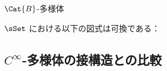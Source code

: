 \documentclass[TQFT_main]{subfiles}
\begin{document}
\begin{mydef}[label=def:B-mfld,breakable]{{$\Cat{B}$}-多様体}
\begin{itemize}
\begin{description}
            $\sSet$ における以下の図式は可換である：
            \begin{center}
            \end{center}
        \end{description}
    \end{itemize}
\end{mydef}

\subsection{$C^\infty$-多様体の接構造との比較}
\end{document}
